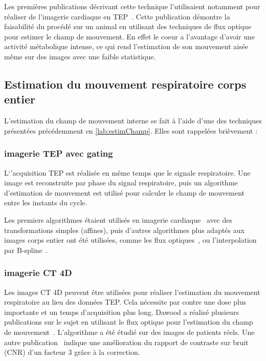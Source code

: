 Les premières publications décrivant cette technique l'utilisaient notamment pour réaliser de l'imagerie cardiaque en TEP~\cite{klein19973d}. Cette publication démontre la faisabilité du procédé sur un animal en utilisant des techniques de flux optique pour estimer le champ de mouvement. En effet le coeur a l'avantage d'avoir une activité métabolique intense, ce qui rend l'estimation de son mouvement aisée même sur des images avec une faible statistique.

\subsection{Estimation du mouvement respiratoire corps entier}

L'estimation du champ de mouvement interne se fait à l'aide d'une des techniques présentées précédemment en \ref{lab:estimChamp}. Elles sont rappelées brièvement :

\subsubsection{imagerie TEP avec gating}
\label{lab:correctionDawood2008}

L`'acquisition TEP est réalisée en même temps que le signale respiratoire. Une image est reconstruite par phase du signal respiratoire, puis un algorithme d'estimation de mouvement est utilisé pour calculer le champ de mouvement entre les instants du cycle.

Les premiers algorithmes étaient utilisés en imagerie cardiaque~\cite{klein2002four} avec des transformations simples (affines), puis d'autres algorithmes plus adaptés aux images corps entier ont été utilisées, comme les flux optiques~\cite{dawood2006lung, dawood2006lung}, ou l'interpolation par B-spline~\cite{bai2009regularized}. 


\subsubsection{imagerie CT 4D}

Les images CT 4D peuvent être utilisées pour réaliser l'estimation du mouvement respiratoire au lieu des données TEP. Cela nécessite par contre une dose plus importante et un temps d'acquisition plus long.
Dawood a réalisé plusieurs publications sur le sujet en utilisant le flux optique pour l'estimation du champ de mouvement~\cite{dawood2006lung, dawood2008respiratory}. L'algorithme a été étudié sur des images de patients réels. Une autre publication~\cite{thorndyke2006reducing} indique une amélioration du rapport de contraste sur bruit (CNR) d'un facteur 3 grâce à la correction.


